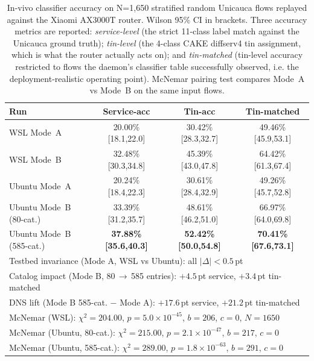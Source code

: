 \documentclass[journal,onecolumn]{IEEEtran}
\begin{document}
\begin{table}[t]
\centering
\caption{In-vivo classifier accuracy on N=1{,}650 stratified random Unicauca
flows replayed against the Xiaomi AX3000T router. Wilson 95\% CI in
brackets. Three accuracy metrics are reported: \emph{service-level} (the
strict 11-class label match against the Unicauca ground truth);
\emph{tin-level} (the 4-class CAKE diffserv4 tin assignment, which is what
the router actually acts on); and \emph{tin-matched} (tin-level accuracy
restricted to flows the daemon's classifier table successfully observed,
i.e. the deployment-realistic operating point). McNemar pairing test
compares Mode~A vs Mode~B on the same input flows.}
\label{tab:invivo_overall}
\begin{tabular}{l|ccc}
\toprule
\textbf{Run} & \textbf{Service-acc} & \textbf{Tin-acc} & \textbf{Tin-matched} \\
\midrule
WSL    Mode~A           & 20.00\% [18.1,22.0] & 30.42\% [28.3,32.7] & 49.46\% [45.9,53.1] \\
WSL    Mode~B           & 32.48\% [30.3,34.8] & 45.39\% [43.0,47.8] & 64.42\% [61.3,67.4] \\
Ubuntu Mode~A           & 20.24\% [18.4,22.3] & 30.61\% [28.4,32.9] & 49.26\% [45.7,52.8] \\
Ubuntu Mode~B (80-cat.) & 33.39\% [31.2,35.7] & 48.61\% [46.2,51.0] & 66.97\% [64.0,69.8] \\
Ubuntu Mode~B (585-cat.) & \textbf{37.88\% [35.6,40.3]} & \textbf{52.42\% [50.0,54.8]} & \textbf{70.41\% [67.6,73.1]} \\
\midrule
\multicolumn{4}{l}{Testbed invariance (Mode A, WSL vs Ubuntu): all $|\Delta| < 0.5$\,pt} \\
\multicolumn{4}{l}{Catalog impact (Mode B, 80\,$\rightarrow$\,585 entries): $+4.5$\,pt service, $+3.4$\,pt tin-matched} \\
\multicolumn{4}{l}{DNS lift (Mode B 585-cat. $-$ Mode A): $+17.6$\,pt service, $+21.2$\,pt tin-matched} \\
\multicolumn{4}{l}{McNemar (WSL):  $\chi^2 = 204.00$, $p = 5.0\!\times\!10^{-45}$, $b{=}206$, $c{=}0$, $N{=}1650$}\\
\multicolumn{4}{l}{McNemar (Ubuntu, 80-cat.): $\chi^2 = 215.00$, $p = 2.1\!\times\!10^{-47}$, $b{=}217$, $c{=}0$}\\
\multicolumn{4}{l}{McNemar (Ubuntu, 585-cat.): $\chi^2 = 289.00$, $p = 1.8\!\times\!10^{-63}$, $b{=}291$, $c{=}0$}\\
\bottomrule
\end{tabular}
\end{table}
\end{document}
